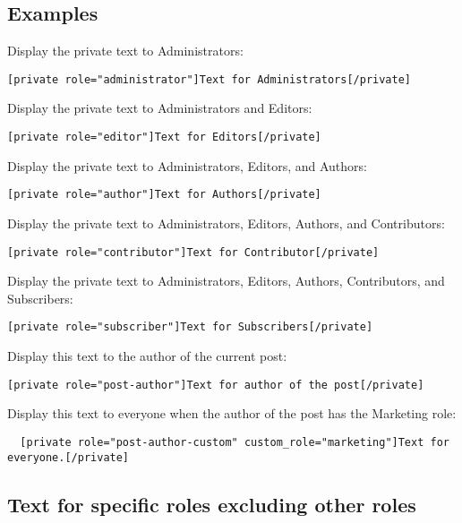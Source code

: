 \subsection{Examples}

Display the private text to Administrators:

\begin{lstlisting}
[private role="administrator"]Text for Administrators[/private]
\end{lstlisting}

Display the private text to Administrators and Editors:

\begin{lstlisting}
[private role="editor"]Text for Editors[/private]
\end{lstlisting}

Display the private text to Administrators, Editors, and Authors:

\begin{lstlisting}
[private role="author"]Text for Authors[/private]
\end{lstlisting}

Display the private text to Administrators, Editors, Authors, and Contributors:

\begin{lstlisting}
[private role="contributor"]Text for Contributor[/private]
\end{lstlisting}

Display the private text to Administrators, Editors, Authors, Contributors, and
Subscribers:

\begin{lstlisting}
[private role="subscriber"]Text for Subscribers[/private]
\end{lstlisting}

Display this text to the author of the current post:

\begin{lstlisting}
[private role="post-author"]Text for author of the post[/private]
\end{lstlisting}

Display this text to everyone when the author of the post has the Marketing
role:

\begin{lstlisting}
  [private role="post-author-custom" custom_role="marketing"]Text for everyone.[/private]
\end{lstlisting}

\subsection{Text for specific roles excluding other roles}

